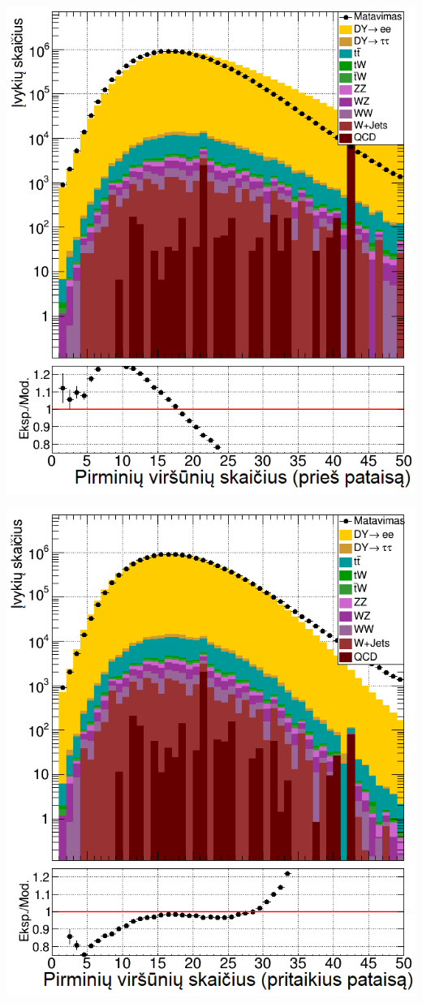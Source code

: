 \documentclass[a4paper, 12pt]{article}
\begin{document}
\begin{centering}
	\begin{minipage}[t]{0.49\linewidth}
		\includegraphics[width=1\linewidth]{eeNVTXbefore_SMALL.png}
	\end{minipage}
	\hfill
	\begin{minipage}[t]{0.49\linewidth}
		\includegraphics[width=1\linewidth]{eeNVTXafter_SMALL.png}

\end{minipage}
\end{centering}
\end{document}
